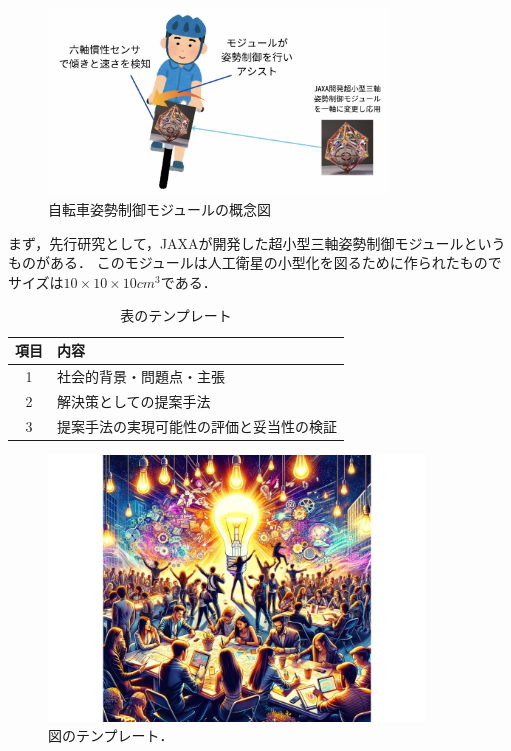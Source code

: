 \documentclass[uplatex,dvipdfmx]{jsarticle}
\begin{document}
\begin{figure}[H]
    \centering
    \includegraphics[width=0.8\textwidth]{fig/moduleGainenn.png}
    \caption{自転車姿勢制御モジュールの概念図}
    \label{fig:moduleGainenn}
\end{figure}

まず，先行研究として，JAXAが開発した超小型三軸姿勢制御モジュールというものがある．
このモジュールは人工衛星の小型化を図るために作られたものでサイズは$10×10×10 {cm}^3$である．



\begin{table}[h]
  \centering
  \caption{表のテンプレート}
  \label{table:presentation}
  \begin{tabular}{cl}
\hline
項目 & 内容 \\\hline \hline
1 & 社会的背景・問題点・主張 \\ \hline
2 & 解決策としての提案手法\\ \hline
3 & 提案手法の実現可能性の評価と妥当性の検証\\ \hline
  \end{tabular}  
\end{table}

\begin{figure}[h]
\centering
 \centering
\includegraphics[width=10cm]{./Figs/idea.pdf}
\caption{図のテンプレート．}
\label{fig:problem}
\end{figure}
\end{document}
